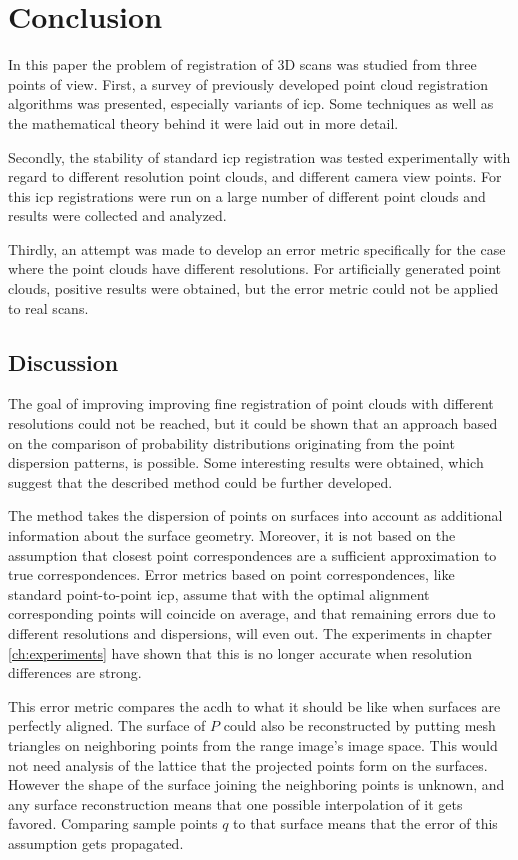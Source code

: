 \chapter{Conclusion}
In this paper the problem of registration of 3D scans was studied from three points of view. First, a survey of previously developed point cloud registration algorithms was presented, especially variants of \gls{icp}. Some techniques as well as the mathematical theory behind it were laid out in more detail. 

Secondly, the stability of standard \gls{icp} registration was tested experimentally with regard to different resolution point clouds, and different camera view points. For this \gls{icp} registrations were run on a large number of different point clouds and results were collected and analyzed.

Thirdly, an attempt was made to develop an error metric specifically for the case where the point clouds have different resolutions. For artificially generated point clouds, positive results were obtained, but the error metric could not be applied to real scans.


\section{Discussion}
The goal of improving improving fine registration of point clouds with different resolutions could not be reached, but it could be shown that an approach based on the comparison of probability distributions originating from the point dispersion patterns, is possible. Some interesting results were obtained, which suggest that the described method could be further developed.

The method takes the dispersion of points on surfaces into account as additional information about the surface geometry. Moreover, it is not based on the assumption that closest point correspondences are a sufficient approximation to true correspondences. Error metrics based on point correspondences, like standard point-to-point \gls{icp}, assume that with the optimal alignment corresponding points will coincide on average, and that remaining errors due to different resolutions and dispersions, will even out. The experiments in chapter \ref{ch:experiments} have shown that this is no longer accurate when resolution differences are strong.

This error metric compares the \gls{acdh} to what it should be like when surfaces are perfectly aligned. The surface of $P$ could also be reconstructed by putting mesh triangles on neighboring points from the range image's image space. This would not need analysis of the lattice that the projected points form on the surfaces. However the shape of the surface joining the neighboring points is unknown, and any surface reconstruction means that one possible interpolation of it gets favored. Comparing sample points $q$ to that surface means that the error of this assumption gets propagated.

